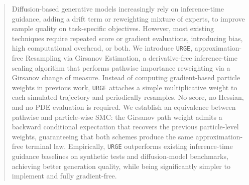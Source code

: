 \documentclass{article}
\theoremstyle{plain}
\theoremstyle{definition}
\theoremstyle{remark}
\begin{document}

\printAffiliationsAndNotice{\icmlEqualContribution} %

\begin{abstract}
Diffusion-based generative models increasingly rely on inference-time guidance, adding a drift term or reweighting mixture of experts, to improve sample quality on task-specific objectives. However, most existing techniques require repeated score or gradient evaluations, introducing bias, high computational overhead, or both. We introduce \texttt{URGE}, approximation-free Resampling via Girsanov Estimation, a derivative-free inference-time scaling algorithm that performs pathwise importance reweighting via a Girsanov change of measure. Instead of computing gradient-based particle weights in previous work, \texttt{URGE} attaches a simple multiplicative weight to each simulated trajectory and periodically resamples. No score, no Hessian, and no PDE evaluation is required. We establish an equivalence between pathwise and particle-wise SMC: the Girsanov path weight admits a backward conditional expectation that recovers the previous particle-level weights, guaranteeing that both schemes produce the same approximation-free terminal law.
 Empirically, \texttt{URGE} outperforms existing inference-time guidance baselines on synthetic tests and diffusion-model benchmarks, achieving better generation quality, while being significantly simpler to implement and fully gradient-free.
\end{abstract}
\end{document}
